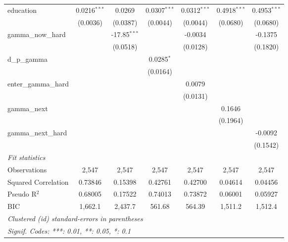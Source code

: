 \begin{tabular}{lcccccc}
   education            & 0.0216$^{***}$  & 0.0269          & 0.0307$^{***}$  & 0.0312$^{***}$  & 0.4918$^{***}$ & 0.4953$^{***}$\\   
                        & (0.0036)        & (0.0387)        & (0.0044)        & (0.0044)        & (0.0680)       & (0.0680)\\   
   gamma\_now\_hard     &                 & -17.85$^{***}$  &                 & -0.0034         &                & -0.1375\\   
                        &                 & (0.0518)        &                 & (0.0128)        &                & (0.1820)\\   
   d\_p\_gamma          &                 &                 & 0.0285$^{*}$    &                 &                &   \\   
                        &                 &                 & (0.0164)        &                 &                &   \\   
   enter\_gamma\_hard   &                 &                 &                 & 0.0079          &                &   \\   
                        &                 &                 &                 & (0.0131)        &                &   \\   
   gamma\_next          &                 &                 &                 &                 & 0.1646         &   \\   
                        &                 &                 &                 &                 & (0.1964)       &   \\   
   gamma\_next\_hard    &                 &                 &                 &                 &                & -0.0092\\   
                        &                 &                 &                 &                 &                & (0.1542)\\   
   \midrule
   \emph{Fit statistics}\\
   Observations         & 2,547           & 2,547           & 2,547           & 2,547           & 2,547          & 2,547\\  
   Squared Correlation  & 0.73846         & 0.15398         & 0.42761         & 0.42700         & 0.04614        & 0.04456\\  
   Pseudo R$^2$         & 0.68005         & 0.17522         & 0.74013         & 0.73872         & 0.06001        & 0.05927\\  
   BIC                  & 1,662.1         & 2,437.7         & 561.68          & 564.39          & 1,511.2        & 1,512.4\\  
   \midrule \midrule
   \multicolumn{7}{l}{\emph{Clustered (id) standard-errors in parentheses}}\\
   \multicolumn{7}{l}{\emph{Signif. Codes: ***: 0.01, **: 0.05, *: 0.1}}\\
\end{tabular}
\par\endgroup


